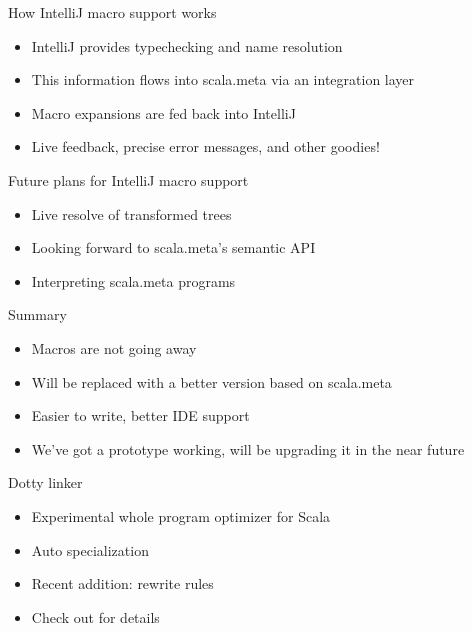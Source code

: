 \documentclass[svgnames,dvipsnames,hyperref={bookmarks=false},usepdftitle=false]{beamer}
\begin{document}
\begin{frame}{How IntelliJ macro support works}
\begin{itemize}
\item IntelliJ provides typechecking and name resolution
\item This information flows into scala.meta via an integration layer
\item Macro expansions are fed back into IntelliJ
\item Live feedback, precise error messages, and other goodies!
\end{itemize}
\end{frame}

\begin{frame}{Future plans for IntelliJ macro support}
\begin{itemize}
\item Live resolve of transformed trees
\item Looking forward to scala.meta's semantic API
\item Interpreting scala.meta programs
\end{itemize}
\end{frame}

\begin{frame}{Summary}
\begin{itemize}
\item Macros are not going away
\item Will be replaced with a better version based on scala.meta
\item Easier to write, better IDE support
\item We've got a prototype working, will be upgrading it in the near future
\end{itemize}
\end{frame}


\begin{frame}{Dotty linker}
\begin{itemize}
\item Experimental whole program optimizer for Scala
\item Auto specialization
\item Recent addition: rewrite rules
\item Check out  for details
\end{itemize}
\end{frame}
\end{document}
